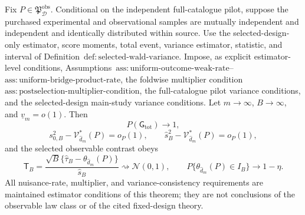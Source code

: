 Fix \(P\in\mathfrak P_{\mathcal D}^{\mathrm{obs}}\). Conditional on the independent full-catalogue pilot, suppose the purchased experimental and observational samples are mutually independent and independent and identically distributed within source. Use the selected-design-only estimator, score moments, total event, variance estimator, statistic, and interval of Definition~\(\mathrm{def{:}selected\text{-}wald\text{-}variance}\). Impose, as explicit estimator-level conditions, Assumptions~\(\mathrm{ass{:}uniform\text{-}outcome\text{-}weak\text{-}rate}\)--\(\mathrm{ass{:}uniform\text{-}bridge\text{-}product\text{-}rate}\), the foldwise multiplier condition \(\mathrm{ass{:}postselection\text{-}multiplier\text{-}condition}\), the full-catalogue pilot variance conditions, and the selected-design main-study variance conditions. Let \(m\to\infty\), \(B\to\infty\), and \(\underline v_m=o(1)\). Then
\[
 P(\mathsf G_{\mathrm{tot}})\longrightarrow1,
\]
\[
 s_{0,B}^2-\mathcal V_{\widehat d_m}^*(P)=o_P(1),
 \qquad
 \widehat s_B^2-\mathcal V_{\widehat d_m}^*(P)=o_P(1),
\]
and the selected observable contrast obeys
\[
 \mathsf T_B=
 \frac{\sqrt B\{\widehat\tau_B-\theta_{\widehat d_m}(P)\}}{\widehat s_B}
 \rightsquigarrow\mathcal N(0,1),
 \qquad
 P\{\theta_{\widehat d_m}(P)\in I_B\}\longrightarrow1-\eta.
\]
All nuisance-rate, multiplier, and variance-consistency requirements are maintained estimator conditions of this theorem; they are not conclusions of the observable law class or of the cited fixed-design theory.